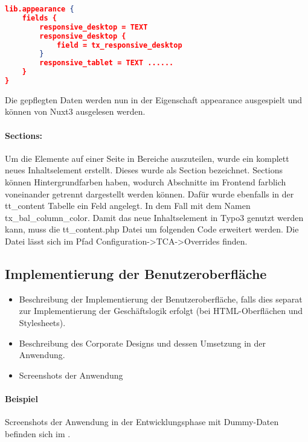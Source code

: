\begin{lstlisting}[language=json,firstnumber=1]
lib.appearance {
    fields {
        responsive_desktop = TEXT
        responsive_desktop {
            field = tx_responsive_desktop
        }
        responsive_tablet = TEXT ......
    }
}
\end{lstlisting}

Die gepflegten Daten werden nun in der Eigenschaft appearance ausgespielt und können von Nuxt3 ausgelesen werden.

\paragraph{Sections:}
Um die Elemente auf einer Seite in Bereiche auszuteilen, wurde ein komplett neues Inhaltselement erstellt. Dieses wurde als Section bezeichnet. Sections können Hintergrundfarben haben, wodurch Abschnitte im Frontend farblich voneinander getrennt dargestellt werden können. Dafür wurde ebenfalls in der tt\_content Tabelle ein Feld angelegt. In dem Fall mit dem Namen tx\_bal\_column\_color. Damit das neue Inhaltselement in Typo3 genutzt werden kann, muss die tt\_content.php Datei um folgenden Code erweitert werden.  Die Datei lässt sich im Pfad \linebreak Configuration->TCA->Overrides finden.



\subsection{Implementierung der Benutzeroberfläche}
\label{sec:ImplementierungBenutzeroberflaeche}

\begin{itemize}
	\item Beschreibung der Implementierung der Benutzeroberfläche, falls dies separat zur Implementierung der Geschäftslogik erfolgt (\zB bei \acs{HTML}-Oberflächen und Stylesheets).
	\item \Ggfs Beschreibung des Corporate Designs und dessen Umsetzung in der Anwendung.
	\item Screenshots der Anwendung
\end{itemize}

\paragraph{Beispiel}
Screenshots der Anwendung in der Entwicklungsphase mit Dummy-Daten befinden sich im .


